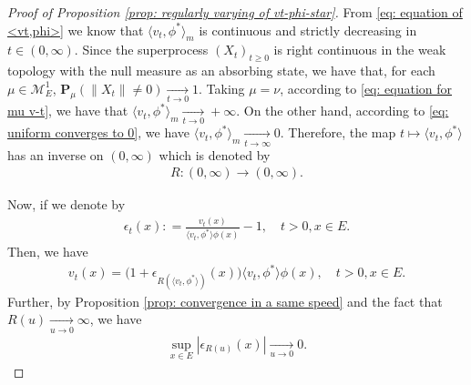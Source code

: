 \documentclass[UTF8]{pkuthss}
\theoremstyle{plain}
\theoremstyle{definition}
\numberwithin{equation}{section}
\begin{document}
\begin{proof}[Proof of Proposition \ref{prop: regularly varying of vt-phi-star}]
	
	From \eqref{eq: equation of <vt,phi>} we know that $\langle v_t,\phi^* \rangle_m$ is continuous and strictly decreasing in $t \in (0,\infty)$.
	Since the superprocess $(X_t)_{t\geq 0}$ is right continuous in the weak topology with the null measure as an absorbing state, we have that, for each $\mu \in \mathcal M_E^1$,
	$\mathbf P_\mu (\|X_t\| \neq 0) \xrightarrow[t\to 0]{} 1$.
	Taking $\mu = \nu$, according to \eqref{eq: equation for mu v-t}, we have that $\langle v_{t}, \phi^*\rangle_m \xrightarrow[t\to 0]{} +\infty$.
	On the other hand, according to \eqref{eq: uniform converges to 0}, we have $\langle v_{t}, \phi^*\rangle_m \xrightarrow[t\to \infty]{} 0$.
	Therefore, the map $t\mapsto \langle v_t,\phi^*  \rangle$ has an inverse on $(0,\infty)$ which is denoted by
\begin{align}
	R: (0,\infty) \to (0,\infty).
\end{align}
	
	Now, if we denote by
\begin{align}
	\epsilon_{t}(x)
	: = \frac{v_t(x)}{\langle v_t, \phi^*\rangle \phi(x)} - 1,
	\quad t>0, x\in E.
\end{align}
	Then, we have
\begin{align}\label{eq: change variable using inverse}
	v_t(x)
	= \big(1+ \epsilon_{R(\langle v_t,\phi^* \rangle)}(x) \big )\langle v_t,\phi^* \rangle \phi(x),
	\quad t>0, x\in E.
\end{align}
	Further, by Proposition \ref{prop: convergence in a same speed} and
	the fact that $R(u)\xrightarrow[u\to 0]{} \infty$, we have
\begin{align}\label{eq: epsilon R converges to 0}
	\sup_{x\in E}|\epsilon_{R(u)}(x)|
	\xrightarrow[u\to 0]{} 0.
\end{align}


\end{proof}
\end{document}
